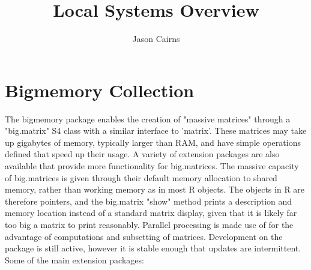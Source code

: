 \documentclass[10pt,a4paper]{article}
\begin{document}
\title{Local Systems Overview}
\author{Jason Cairns}
  
\maketitle{}

\section{Bigmemory Collection}
\label{sec:bigmemory-collection}

The bigmemory package enables the creation of "massive matrices"
through a "big.matrix" S4 class with a similar interface to
'matrix'\cite{kane13:bigmemory}. These matrices may take up gigabytes
of memory, typically larger than RAM, and have simple operations
defined that speed up their usage. A variety of extension packages are
also available that provide more functionality for big.matrices. The
massive capacity of big.matrices is given through their default memory
allocation to shared memory, rather than working memory as in most R
objects. The objects in R are therefore pointers, and the big.matrix
"show" method prints a description and memory location instead of a
standard matrix display, given that it is likely far too big a matrix
to print reasonably. Parallel processing is made use of for the
advantage of computations and subsetting of matrices. Development on
the package is still active, however it is stable enough that updates
are intermittent. Some of the main extension packages:
\end{document}
